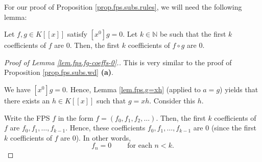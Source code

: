 For our proof of Proposition \ref{prop.fps.subs.rules}, we will need the
following lemma:

\begin{lemma}
\label{lem.fps.fg-coeffs-0}Let $f,g\in K\left[  \left[  x\right]  \right]  $
satisfy $\left[  x^{0}\right]  g=0$. Let $k\in\mathbb{N}$ be such that the
first $k$ coefficients of $f$ are $0$. Then, the first $k$ coefficients of
$f\circ g$ are $0$.
\end{lemma}

\begin{proof}
[Proof of Lemma \ref{lem.fps.fg-coeffs-0}.]This is very similar to the proof
of Proposition \ref{prop.fps.subs.wd} \textbf{(a)}.

We have $\left[  x^{0}\right]  g=0$. Hence, Lemma \ref{lem.fps.g=xh} (applied
to $a=g$) yields that there exists an $h\in K\left[  \left[  x\right]
\right]  $ such that $g=xh$. Consider this $h$.

Write the FPS $f$ in the form $f=\left(  f_{0},f_{1},f_{2},\ldots\right)  $.
Then, the first $k$ coefficients of $f$ are $f_{0},f_{1},\ldots,f_{k-1}$.
Hence, these coefficients $f_{0},f_{1},\ldots,f_{k-1}$ are $0$ (since the
first $k$ coefficients of $f$ are $0$). In other words,%
\begin{equation}
f_{n}=0\ \ \ \ \ \ \ \ \ \ \text{for each }n<k.
\label{pf.lem.fps.fg-coeffs-0.gn=0}%
\end{equation}



\end{proof}
